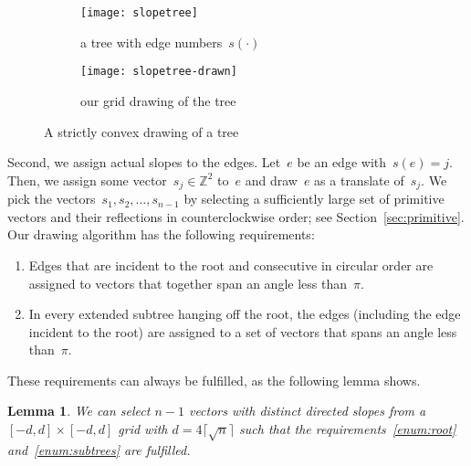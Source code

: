 \documentclass[a4paper,11pt]{article}
\theoremstyle{plain}
\newtheorem{lemma}{Lemma}
\begin{document}
\begin{figure}[tb]
  \begin{subfigure}[b]{.5\columnwidth}
    \centering
    \texttt{[image: slopetree]}
    \caption{a tree with edge numbers~$s(\cdot)$ }
    \label{fig:slopetree}
  \end{subfigure}
  \hfill
  \begin{subfigure}[b]{.47\columnwidth}
    \centering
    \texttt{[image: slopetree-drawn]}
    \caption{our grid drawing of the tree}
    \label{fig:slopetree-drawn}
  \end{subfigure}
  \caption{A strictly convex drawing of a tree}
\end{figure}

Second, we assign actual slopes to the edges.  Let~$e$ be an edge
with~$s(e)=j$.  Then, we assign some vector~$s_j\in\mathbb{Z}^2$ to~$e$ and 
draw~$e$ as a translate of~$s_j$.  We pick the
vectors~$s_1, s_2, \dots, s_{n-1}$ by selecting a sufficiently large
set of primitive vectors and their reflections in counterclockwise
order; see Section~\ref{sec:primitive}.  
Our drawing algorithm has the following requirements:

\begin{enumerate}[label=(R\arabic*),ref=R\arabic*]
\item \label{enum:root}Edges that are incident to the root and consecutive in circular
  order are assigned to vectors that together span  an angle less than~$\pi$.
\item \label{enum:subtrees}In every extended subtree hanging off the root, the edges 
  (including the edge incident to the root) 
  are assigned to a set of vectors that spans an angle less than~$\pi$.
\end{enumerate}

These requirements can always be fulfilled, as the following lemma shows.

\begin{lemma}\label{lem:slope-preselection}
  We can select $n-1$ vectors with distinct directed slopes 
  from a $[-d,d] \times [-d,d]$ grid with $d=4 \lceil\sqrt{n}\rceil$
  such that the requirements~\ref{enum:root}
  and~\ref{enum:subtrees} are fulfilled.
\end{lemma}
\end{document}
